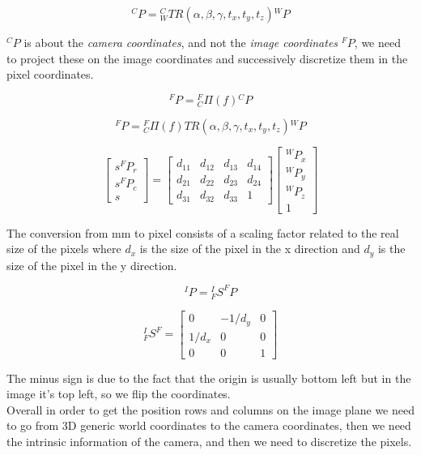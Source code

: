 \[
    {}^CP = {}^C_W TR(\alpha, \beta, \gamma, t_x, t_y, t_z) {}^WP
\]

\({}^CP\) is about the \textit{camera coordinates}, and
not the \textit{image coordinates} \({}^FP\), we need to project these on the image coordinates and successively discretize them in the pixel coordinates.

\[
    {}^FP = {}^F_C \varPi (f) {}^CP
\]

\[
    {}^FP = {}^F_C \varPi (f) TR(\alpha, \beta, \gamma, t_x, t_y, t_z) {}^WP
\]


\[
    \begin{bmatrix}
        s^FP_r \\
        s^FP_c \\
        s
    \end{bmatrix}
    =
    \begin{bmatrix}
        d_{11} & d_{12} & d_{13} & d_{14} \\
        d_{21} & d_{22} & d_{23} & d_{24} \\
        d_{31} & d_{32} & d_{33} & 1
    \end{bmatrix}
    \begin{bmatrix}
        {}^WP_x \\
        {}^WP_y \\
        {}^WP_z \\
        1
    \end{bmatrix}
\]

The conversion from mm to pixel consists of a scaling factor related to the real size of the pixels where \(d_x\) is the size of the pixel in the x direction and \(d_y\) is the size of the pixel in the y direction.

\[
  {}^IP={}^I_F S^F P  
\]


\[
    {}^I_F S^F
    = 
    \begin{bmatrix}
        0 & -1/d_y & 0\\
        1/d_x & 0 & 0\\
        0 & 0 & 1
    \end{bmatrix}
\]

The minus sign is due to the fact that the origin is usually bottom left but in the image it's top left, so we flip the coordinates.
\\
Overall in order to get the position rows and columns on the image plane we need to go from 3D generic world coordinates to the camera coordinates, then we need the intrinsic information of the camera, and then we need to discretize the pixels.

